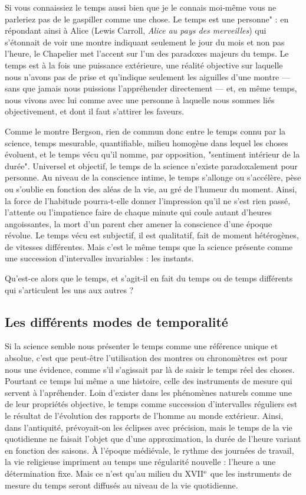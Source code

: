 Si vous connaissiez le temps aussi bien que je le connais moi-même vous ne parleriez pas de le gaspiller comme une chose. Le temps est une personne" : en répondant ainsi à Alice (Lewis Carroll, {\it Alice au pays des merveilles}) qui s'étonnait de voir une montre indiquant seulement le jour du mois et non pas l'heure, le Chapelier met l'accent sur l'un des paradoxes majeurs du temps. Le temps est à la fois une puissance extérieure, une réalité objective sur laquelle nous n'avons pas de prise et qu'indique seulement les aiguilles d'une montre — sans que jamais nous puissions l'appréhender directement — et, en même temps, nous vivons avec lui comme avec une personne à laquelle nous sommes liés objectivement, et dont il faut s'attirer les faveurs.

Comme le montre Bergson, rien de commun donc entre le temps connu par la science, temps mesurable, quantifiable, milieu homogène dans lequel les choses évoluent, et le temps vécu qu'il nomme, par opposition, "sentiment intérieur de la durée". Universel et objectif, le temps de la science n'existe paradoxalement pour personne. Au niveau de la conscience intime, le temps s'allonge ou s'accélère, pèse ou s'oublie en fonction des aléas de la vie, au gré de l'humeur du moment. Ainsi, la force de l'habitude pourra-t-elle donner l'impression qu'il ne s'est rien passé, l'attente ou l'impatience faire de chaque minute qui coule autant d'heures angoissantes, la mort d'un parent cher amener la conscience d'une époque révolue. Le temps vécu est subjectif, il est qualitatif, fait de moment hétérogènes, de vitesses différentes. Mais c'est le même temps que la science présente comme une succession d'intervalles invariables : les instants.

Qu'est-ce alors que le temps, et s'agit-il en fait du temps ou de temps différents qui s'articulent les uns aux autres ?

\subsection{Les différents modes de temporalité}

Si la science semble nous présenter le temps comme une référence unique et absolue, c'est que peut-être l'utilisation des montres ou chronomètres est pour nous une évidence, comme s'il s'agissait par là de saisir le temps réel des choses. Pourtant ce temps lui même a une histoire, celle des instruments de mesure qui servent à l'apréhender. Loin d'exister dans les phénomènes naturels comme une de leur propriétés objective, le temps comme succession d'intervalles réguliers est le résultat de l'évolution des rapports de l'homme au monde extérieur. Ainsi, dans l'antiquité, prévoyait-on les éclipses avec précision, mais le temps de la vie quotidienne ne faisait l'objet que d'une approximation, la durée de l'heure variant en fonction des saisons. À l'époque médiévale, le rythme des journées de travail, la vie religieuse impriment au temps une régularité nouvelle : l'heure a une détermination fixe. Mais ce n'est qu'au milieu du XVII${^{\text e}}$ que les instruments de mesure du temps seront diffusés au niveau de la vie quotidienne.

